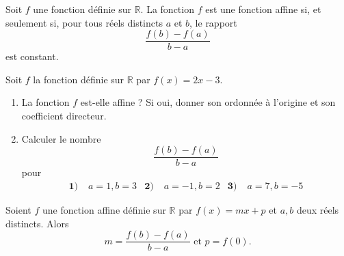 \documentclass[11pt]{article}
\begin{document}
\begin{prop}
  \begin{minipage}[]{.5\textwidth}
  Soit $f$ une fonction définie sur $\mathbb{R}$. La fonction $f$ est une
  fonction affine si, et seulement si, pour tous réels distincts $a$ et $b$, le
  rapport
  \[
    \frac{f(b)-f(a)}{b-a}
  \]
  est constant.
  \end{minipage}
  \begin{minipage}[]{.5\textwidth}
    \begin{center}
    \end{center}
  \end{minipage}
\end{prop}

\begin{app}
  Soit $f$ la fonction définie sur $\mathbb{R}$ par $f(x)=2x-3$.
  \begin{enumerate}
    \item La fonction $f$ est-elle affine ? Si oui, donner son ordonnée à
      l'origine et son coefficient directeur.
    \item Calculer le nombre 
  \[
    \frac{f(b)-f(a)}{b-a}
  \]
  pour
  \begin{align*}
    \textbf{1)}\;& a=1, b=3 &
    \textbf{2)}\;& a=-1, b=2 &
    \textbf{3)}\;& a=7, b=-5
  \end{align*}
  \end{enumerate}
\end{app}

\begin{prop}
  \begin{minipage}[]{.5\textwidth}
  Soient $f$ une fonction affine définie sur $\mathbb{R}$ par $f(x)=mx+p$ et $a,
  b$ deux réels distincts. Alors
  \[
    m=\frac{f(b)-f(a)}{b-a}\text{ et } p = f(0).
  \]
  \end{minipage}
  \begin{minipage}[]{.5\textwidth}
    \begin{center}
    \end{center}
  \end{minipage}
\end{prop}
\end{document}
